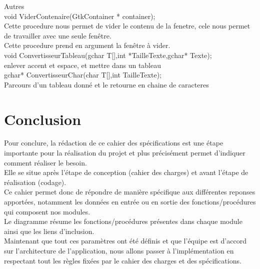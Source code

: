 \documentclass[a4]{article}
\begin{document}
	Autres\\
	
	void ViderContenaire(GtkContainer * container);\\
		Cette procedure nous permet de vider le contenu de la fenetre, cele nous permet de travailler avec une seule fenêtre.\\
		Cette procedure prend en argument la fenêtre à vider.\\
	void ConvertisseurTableau(gchar T[],int *TailleTexte,gchar* Texte);\\
		enlever accent et espace, et mettre dans un tableau\\
	 
	gchar* ConvertisseurChar(char T[],int TailleTexte); \\
		Parcours d'un tableau donné et le retourne en chaine de caracteres\\
		
	
	\section{Conclusion}
	
	Pour conclure, la rédaction de ce cahier des spécifications est une étape importante pour la réalisation du projet
	et plus précisément permet d'indiquer comment réaliser le besoin.\\
	
	Elle se situe après l'étape de conception (cahier des charges) et avant l'étape de réalisation (codage).\\
	
	Ce cahier permet donc de répondre de manière spécifique aux différentes reponses apportées, notamment les données en entrée
	ou en sortie des fonctions/procédures qui composent nos modules.\\
	
	Le diagramme résume les fonctions/procédures présentes dans chaque module ainsi que les liens d'inclusion.\\
	
	Maintenant que tout ces paramètres ont été définis et que l'équipe est d'accord sur l'architecture de l'application, nous allons
	passer à l'implémentation en respectant tout les règles fixées par le cahier des charges et des spécifications.
	
	
\end{document}
